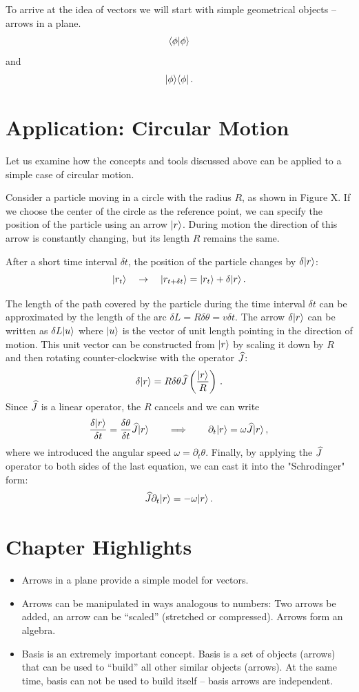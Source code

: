 To arrive at the idea of vectors we will start with simple geometrical
objects -- arrows in a plane.
\[
\langle{\phi}|{\phi\rangle}
\]
and
\[
|{\phi}\rangle\langle{\phi}|\,.
\]

\section{Application: Circular Motion}
Let us examine how the concepts and tools discussed above can be applied to a simple case of circular motion.  

Consider a  particle moving in a circle with the radius $R$, as shown in Figure X. If we choose the center of the circle as the reference point, we can specify the position of the particle using an arrow $|{r}\rangle$. During motion the direction of this arrow is constantly changing, but its length $R$ remains the same.  

After a short time interval $\delta t$, the position of the particle changes by $\delta|{r}\rangle$:
\[
|{r_t}\rangle\quad\rightarrow\quad |{r_{t+\delta t}}\rangle = |{r_t}\rangle+\delta|{r}\rangle\,.
\]

The length of the path covered by the particle during the time interval $\delta t$ can be approximated by the length of the arc  $\delta L=R\delta\theta=v\delta t$. The arrow $\delta|{r}\rangle$ can be written as $\delta L|{u}\rangle$ where $|{u}\rangle$ is the vector of unit length pointing in the direction of motion. This unit vector can be constructed from $|{r}\rangle$ by scaling it down by $R$ and then rotating counter-clockwise with the operator $\widehat{J}$: 
\[
\delta|{r}\rangle=R\delta\theta\widehat{J}\left(\frac{|{r}\rangle}{R}\right)\,.
\]
Since $\widehat{J}$ is a linear operator, the $R$ cancels and we can write
\[
\frac{\delta|{r}\rangle}{\delta t}=\frac{\delta\theta}{\delta t}\widehat{J}|{r}\rangle\qquad\Longrightarrow\qquad
\partial_t|{r}\rangle=\omega\widehat{J}|{r}\rangle\,,
\]
where we introduced the angular speed $\omega=\partial_t\theta$. Finally, by applying the $\widehat{J}$ operator to both sides of the last equation, we can cast it into the "Schrodinger" form:
\[
\widehat{J}\partial_t|{r}\rangle=-\omega|{r}\rangle\,.
\]  



\section*{Chapter Highlights}
{\chhc
  \it
\begin{itemize}
\item Arrows in a plane provide a simple model for vectors.
\item Arrows can be manipulated in ways analogous to numbers: Two arrows
  be added, an arrow can be ``scaled'' (stretched or compressed). Arrows form
  an algebra.
\item Basis is an extremely important concept. Basis is a set of
  objects (arrows) that can be used to ``build'' all other similar
  objects (arrows). At the same time, basis can not be used to build
  itself -- basis arrows are independent.
\end{itemize}
}
